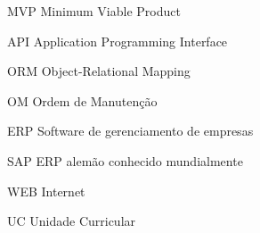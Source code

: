 \documentclass[
	12pt,				%
	openright,			%
	oneside,			%
	a4paper,			%
	chapter=TITLE,		%
	english,			%
	brazil,				%
	]{./Data/udesc}
\begin{document}


\begin{siglas}
  \item[MVP]      Minimum Viable Product
  \item[API]      Application Programming Interface
  \item[ORM]      Object-Relational Mapping
  \item[OM]		  Ordem de Manutenção
  \item[ERP]      Software de gerenciamento de empresas
  \item[SAP]	  ERP alemão conhecido mundialmente
  \item[WEB]	  Internet
  \item[UC]		  Unidade Curricular
\end{siglas}


\tableofcontents*
\cleardoublepage

\textual











% 

\postextual




%
%

\end{document}
